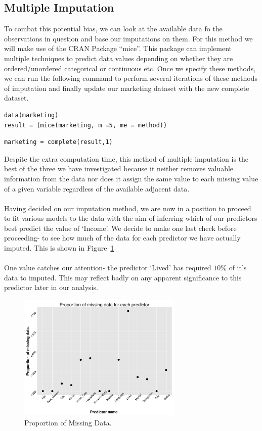 \documentclass{article}
\begin{document}
\subsection{Multiple Imputation}
To combat this potential bias, we can look at the available data fo the observations in question and base our imputations on them. For this method we will make use of the CRAN Package “mice”. This package can implement multiple techniques to predict data values depending on whether they are ordered/unordered categorical or continuous etc. Once we specify these methods, we can run the  following command to perform several iterations of these methods of imputation and finally update our marketing dataset with the new complete dataset.
{\small
\begin{verbatim}
data(marketing)
result = (mice(marketing, m =5, me = method))
\end{verbatim}

\begin{verbatim}
marketing = complete(result,1)
\end{verbatim}
}
\noindent Despite the extra computation time, this method of multiple imputation is the best of the three we have investigated because it neither removes valuable information from the data nor does it assign the same value to each missing value of a given variable regardless of the available adjacent data.
\\\\
Having decided on our imputation method, we are now in a position to proceed to fit various models to the data with the aim of inferring which of our predictors best predict the value of `Income'. We decide to make one last check before proceeding- to see how much of the data for each predictor we have actually imputed. This is shown in Figure~\ref{Proportion}
\\\\
One value catches our attention- the predictor `Lived' has required $10\%$ of it's data to imputed. This may reflect badly on any apparent significance to this predictor later in our analysis.
\begin{figure}[h!]
  \centering
  \includegraphics[width=0.7\textwidth]{HandlingMissingData/PropMissingData.pdf}
  \caption{Proportion of Missing Data.}
  \label{Proportion}
\end{figure}
\end{document}

